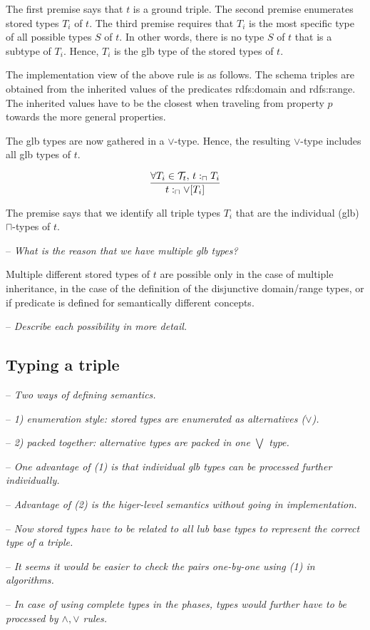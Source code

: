\documentclass[runningheads]{llncs}
\newcommand{\T}{{\cal T}}
\newcommand{\notes}[1]{\noindent\begin{small}-- \emph{#1}\\\end{small}}
\begin{document}
The first premise says that $t$ is a ground triple. The second premise
enumerates stored types $T_i$ of $t$. The third premise requires that
$T_i$ is the most specific type of all possible types $S$ of $t$. In
other words, there is no type $S$ of $t$ that is a subtype of
$T_i$. Hence, $T_i$ is the glb type of the stored types of $t$.

The implementation view of the above rule is as follows. The schema
triples are obtained from the inherited values of the predicates
rdfs:domain and rdfs:range. The inherited values have to be the
closest when traveling from property $p$ towards the more general
properties.

The glb types are now gathered in a $\lor$-type. Hence, the resulting
$\lor$-type includes all glb types of $t$.

\begin{equation}
\dfrac{\forall\/T_i\in\T_t,\, t:_\sqcap\/T_i}
      {t:_\sqcap\lor[T_i]}
\end{equation}

The premise says that we identify all triple types $T_i$ that
are the individual (glb) $\sqcap$-types of $t$. 

\medskip
\notes{What is the reason that we have multiple glb types?}

Multiple different stored types of $t$ are possible only in
the case of multiple inheritance, in the case of the definition of the
disjunctive domain/range types, or if predicate is defined for
semantically different concepts.

\notes{Describe each possibility in more detail.}





\subsection{Typing a triple}

\notes{Two ways of defining semantics.}
\notes{1) enumeration style: stored types are enumerated as alternatives ($\lor$).}
\notes{2) packed together: alternative types are packed in one $\bigvee$ type.}
\notes{One advantage of (1) is that individual glb types can be processed further individually.}
\notes{Advantage of (2) is the higer-level semantics without going in implementation.}

\notes{Now stored types have to be related to all lub base types to represent the correct type of a triple.}
\notes{It seems it would be easier to check the pairs one-by-one using (1) in algorithms.}
\notes{In case of using complete types in the phases, types would further have to be processed by $\land,\lor$ rules.}
\end{document}
